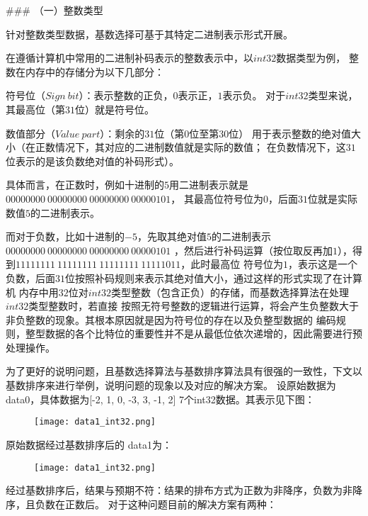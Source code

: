 ### （一）整数类型

针对整数类型数据，基数选择可基于其特定二进制表示形式开展。

在遵循计算机中常用的二进制补码表示的整数表示中，以\(int32\)数据类型为例，
整数在内存中的存储分为以下几部分：

符号位（\(Sign\ bit\)）：表示整数的正负，\(0\)表示正，\(1\)表示负。
对于\(int32\)类型来说，其最高位（第\(31\)位）就是符号位。

数值部分（\(Value\ part\)）：剩余的\(31\)位（第\(0\)位至第\(30\)位）
用于表示整数的绝对值大小（在正数情况下，其对应的二进制数值就是实际的数值；
在负数情况下，这\(31\)位表示的是该负数绝对值的补码形式）。

具体而言，在正数时，例如十进制的\(5\)用二进制表示就是\(00000000\ 00000000\ 00000000\ 00000101\)，
其最高位符号位为\(0\)，后面\(31\)位就是实际数值\(5\)的二进制表示。

而对于负数，比如十进制的\(-5\)，先取其绝对值\(5\)的二进制表示\(00000000\ 00000000\ 00000000\ 00000101\)
，然后进行补码运算（按位取反再加\(1\)），得到\(11111111\ 11111111\ 11111111\ 11111011\)，此时最高位
符号位为\(1\)，表示这是一个负数，后面\(31\)位按照补码规则来表示其绝对值大小，通过这样的形式实现了在计算机
内存中用\(32\)位对\(int32\)类型整数（包含正负）的存储，而基数选择算法在处理\(int32\)类型整数时，若直接
按照无符号整数的逻辑进行运算，将会产生负整数大于非负整数的现象。其根本原因就是因为符号位的存在以及负整型数据的
编码规则，整型数据的各个比特位的重要性并不是从最低位依次递增的，因此需要进行预处理操作。

为了更好的说明问题，且基数选择算法与基数排序算法具有很强的一致性，下文以基数排序来进行举例，说明问题的现象以及对应的解决方案。
设原始数据为data0，具体数据为[-2, 1, 0,  -3, 3, -1, 2]  7个int32数据。其表示见下图：

\begin{figure}[ht]
    \centering
    \texttt{[image: data1\_int32.png]}
    \caption{}
    \label{fig:data1_int32}
\end{figure}


原始数据经过基数排序后的 data1为：

\begin{figure}[ht]
    \centering
    \texttt{[image: data1\_int32.png]}
    \caption{}
    \label{fig:data1_int32}
\end{figure}


经过基数排序后，结果与预期不符：结果的排布方式为正数为非降序，负数为非降序，且负数在正数后。
对于这种问题目前的解决方案有两种：

